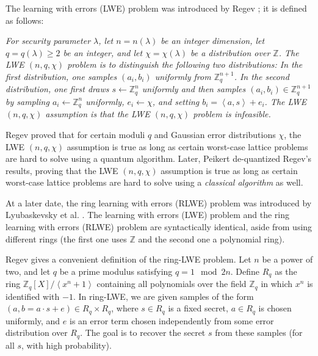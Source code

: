 The learning with errors (LWE) problem was introduced by Regev \cite{Regev:2005:LLE:1060590.1060603}; it is defined as follows:

\textit{For security parameter $\lambda$, let $n = n(\lambda)$ be an integer dimension, let $q=q(\lambda) \geq 2$ be an integer, and let $\chi = \chi(\lambda)$ be a distribution over $\mathbb{Z}$. The LWE $(n, q, \chi)$ problem is to distinguish the following two distributions: In the first distribution, one samples $(a_{i},b_{i})$ uniformly from $\mathbb{Z}_{q}^{n+1}$. In the second distribution, one first draws $s \leftarrow \mathbb{Z}_{q}^{n}$ uniformly and then samples $(a_{i}, b_{i}) \in \mathbb{Z}_{q}^{n+1}$ by sampling $a_{i} \leftarrow \mathbb{Z}_{q}^{n}$ uniformly, $e_{i} \leftarrow \chi$, and setting $b_{i} = \left \langle a,s  \right \rangle + e_{i}$. The LWE $(n, q, \chi)$ assumption is that the LWE $(n, q, \chi)$ problem is infeasible.}

Regev proved that for certain moduli $q$ and Gaussian error distributions $\chi$, the LWE $(n, q, \chi)$ assumption is true as long as certain worst-case lattice problems are hard to solve using a quantum algorithm. Later, Peikert \cite{Peikert:2009:PCW:1536414.1536461} de-quantized Regev's results, proving that the LWE $(n, q, \chi)$ assumption is true as long as certain worst-case lattice problems are hard to solve using a \emph{classical algorithm} as well.

At a later date, the ring learning with errors (RLWE) problem was introduced by Lyubaskevsky et al. \cite{rlwe2010}. The learning with errors (LWE) problem and the ring learning with errors (RLWE) problem are syntactically identical, aside from using different rings (the first one uses $\mathbb{Z}$ and the second one a polynomial ring). 

Regev \cite{regevlearning} gives a convenient definition of the ring-LWE problem. Let $n$ be a power of two, and let $q$ be a prime modulus satisfying $q=1 \mod 2n$. Define $R_{q}$ as the ring $\mathbb{Z}_{q}[X] / \left \langle x^{n} + 1 \right \rangle$ containing all polynomials over the field $\mathbb{Z}_{q}$ in which $x^{n}$ is identified with $-1$. In ring-LWE, we are given samples of the form $(a, b = a \cdot s + e) \in R_{q} \times R_{q}$, where $s \in R_{q}$ is a fixed secret, $a \in R_{q}$ is chosen uniformly, and $e$ is an error term chosen independently from some error distribution over $R_{q}$. The goal is to recover the secret $s$ from these samples (for all $s$, with high probability).

